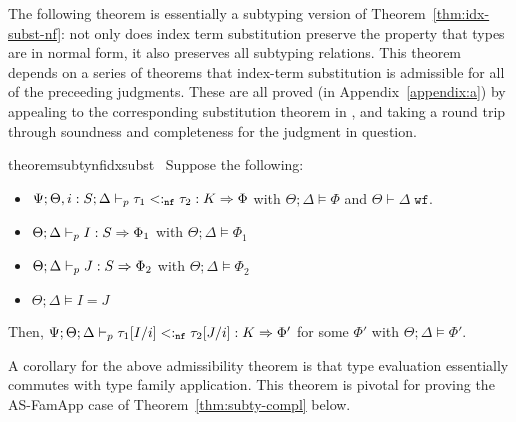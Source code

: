 The following theorem is essentially a subtyping version of Theorem~\ref{thm:idx-subst-nf}: not only does index term substitution preserve the property that types are in normal form, it also preserves all subtyping relations. This theorem depends on a series of theorems that index-term substitution is admissible for all of the preceeding judgments. These are all proved (in Appendix~\ref{appendix:a}) by appealing to the corresponding substitution theorem in \dlambdaamor, and taking a round trip through soundness and completeness for the judgment in question.

\begin{restatable}{theorem}{subtynfidxsubst}
\label{thm:subtynf-idx-subst}
~Suppose the following:
 \begin{itemize}
   \item $\Psi ; \Theta, i : S ; \Delta \vdash_p \tau_1 <:_{\texttt{nf}} \tau_2 : K \Rightarrow \Phi$ with $\Theta ; \Delta \vDash \Phi$ and $\Theta \vdash \Delta \; \texttt{wf}$.
   \item $\Theta ; \Delta \vdash_p I : S \Rightarrow \Phi_1$ with $\Theta ; \Delta \vDash \Phi_1$
   \item $\Theta ; \Delta \vdash_p J : S \Rightarrow \Phi_2$ with $\Theta ; \Delta \vDash \Phi_2$ 
   \item $\Theta ; \Delta \vDash I = J$
 \end{itemize}
 Then, $\Psi ; \Theta ; \Delta \vdash_p \tau_1[I/i] <:_{\texttt{nf}} \tau_2[J/i] : K \Rightarrow \Phi'$ for some $\Phi'$ with $\Theta ; \Delta \vDash \Phi'$.
\end{restatable}

A corollary for the above admissibility theorem is that type evaluation essentially commutes with type family application. This theorem is pivotal for proving the AS-FamApp case of Theorem~\ref{thm:subty-compl} below.


